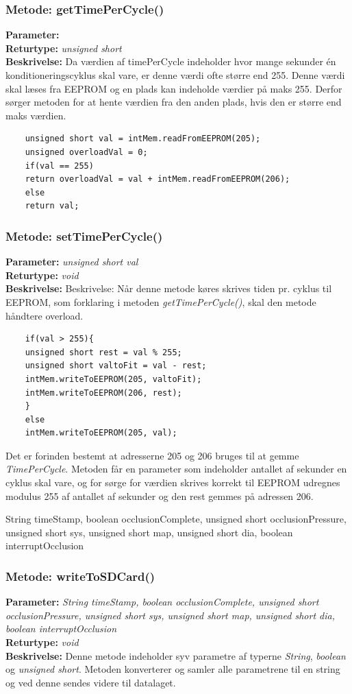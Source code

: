 \subsubsection{Metode: getTimePerCycle()}
\textbf{Parameter: } 
\\ \textbf{Returtype: } \textit{unsigned short}
\\ \textbf{Beskrivelse: } Da værdien af timePerCycle indeholder hvor mange sekunder én konditioneringscyklus skal vare, er denne værdi ofte større end 255. Denne værdi skal læses fra EEPROM og en plads kan indeholde værdier på maks 255. Derfor sørger metoden for at hente værdien fra den anden plads, hvis den er større end maks værdien. 
\begin{lstlisting}
	unsigned short val = intMem.readFromEEPROM(205);
	unsigned overloadVal = 0;
	if(val == 255)
	return overloadVal = val + intMem.readFromEEPROM(206);
	else
	return val;
\end{lstlisting}


\subsubsection{Metode: setTimePerCycle()}
\textbf{Parameter: } \textit{unsigned short val}
\\ \textbf{Returtype: } \textit{void}
\\ \textbf{Beskrivelse: } Beskrivelse: Når denne metode køres skrives tiden pr. cyklus til EEPROM, som forklaring i metoden \textit{getTimePerCycle()}, skal den metode håndtere overload. 
\begin{lstlisting}
	if(val > 255){
	unsigned short rest = val % 255;
	unsigned short valtoFit = val - rest;
	intMem.writeToEEPROM(205, valtoFit);
	intMem.writeToEEPROM(206, rest);
	}
	else
	intMem.writeToEEPROM(205, val);
\end{lstlisting}
Det er forinden bestemt at adresserne 205 og 206 bruges til at gemme \textit{TimePerCycle}. Metoden får en parameter som indeholder antallet af sekunder en cyklus skal vare, og for sørge for værdien skrives korrekt til EEPROM udregnes modulus 255 af antallet af sekunder og den rest gemmes på adressen 206. 

String timeStamp, boolean occlusionComplete, unsigned short occlusionPressure, unsigned short sys, unsigned short map, unsigned short dia, boolean interruptOcclusion

\subsubsection{Metode: writeToSDCard()}
\textbf{Parameter: } \textit{String timeStamp, boolean occlusionComplete, unsigned short occlusionPressure, unsigned short sys, unsigned short map, unsigned short dia, boolean interruptOcclusion}
\\ \textbf{Returtype: } \textit{void}
\\ \textbf{Beskrivelse: }  Denne metode indeholder syv parametre af typerne \textit{String}, \textit{boolean} og \textit{unsigned short}. Metoden konverterer og samler alle parametrene til en string og ved denne sendes videre til datalaget.